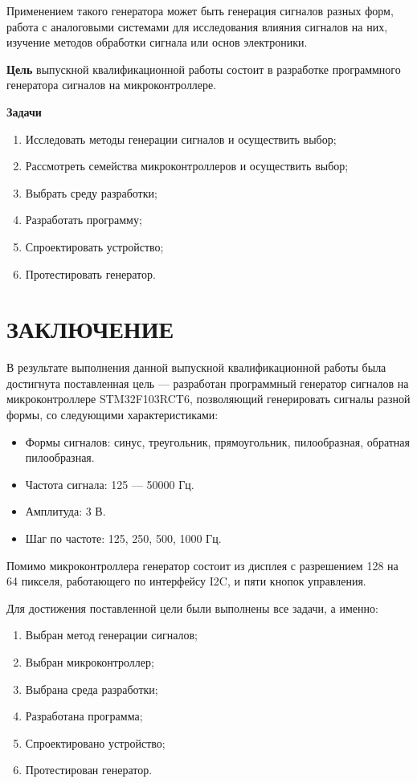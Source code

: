 \documentclass[14pt, oneside]{altsu-bachelor}
\begin{document}
	Применением такого генератора может быть генерация сигналов разных форм, работа с аналоговыми системами для исследования влияния сигналов на них, изучение методов обработки сигнала или основ электроники. 
	
\textbf{Цель}
	выпускной квалификационной работы состоит в разработке программного генератора сигналов на микроконтроллере.

\textbf{Задачи}

	\begin{enumerate}
		\item Исследовать методы генерации сигналов и осуществить выбор;
		\item Рассмотреть семейства микроконтроллеров и осуществить выбор;
		\item Выбрать среду разработки;
		\item Разработать программу;
		\item Спроектировать устройство;
		\item Протестировать генератор.
	\end{enumerate}





\chapter*{ЗАКЛЮЧЕНИЕ}
	В результате выполнения данной выпускной квалификационной работы была достигнута поставленная цель --- разработан программный генератор сигналов на микроконтроллере STM32F103RCT6, позволяющий генерировать сигналы разной формы, со следующими характеристиками:

	\begin{itemize}
		\item Формы сигналов: синус, треугольник, прямоугольник, пилообразная, обратная пилообразная.
		\item Частота сигнала: 125 --- 50000 Гц.
		\item Амплитуда: 3 В.
		\item Шаг по частоте: 125, 250, 500, 1000 Гц.
	\end{itemize}

	Помимо микроконтроллера генератор состоит из дисплея с разрешением 128 на 64 пикселя, работающего по интерфейсу I2C, и пяти кнопок управления.

	Для достижения поставленной цели были выполнены все задачи, а именно:
	\begin{enumerate}
		\item Выбран метод генерации сигналов;
		\item Выбран микроконтроллер;
		\item Выбрана среда разработки;
		\item Разработана программа;
		\item Спроектировано устройство;
		\item Протестирован генератор.
	\end{enumerate}
\end{document}
